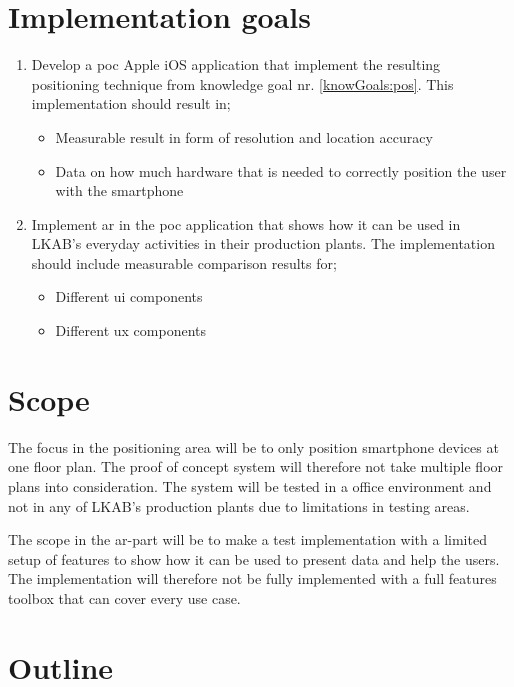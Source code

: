 \section{Implementation goals}
\begin{enumerate}
\item \label{implGoals:posPoc} Develop a \acrfull{poc} Apple iOS application that implement the resulting positioning technique from knowledge goal nr. \ref{knowGoals:pos}. This implementation should result in;
\begin{itemize}
\item Measurable result in form of resolution and location accuracy
\item Data on how much hardware that is needed to correctly position the user with the smartphone
\end{itemize}
\item Implement \acrshort{ar} in the \acrshort{poc} application that shows how it can be used in LKAB's everyday activities in their production plants.
The implementation should include measurable comparison results for;
\begin{itemize}
\item Different \acrfull{ui} components
\item Different \acrfull{ux} components
\end{itemize}
\end{enumerate}

\section{Scope}
The focus in the positioning area will be to only position smartphone devices at one floor plan.
The proof of concept system will therefore not take multiple floor plans into consideration.
The system will be tested in a office environment and not in any of LKAB's production plants due to limitations in testing areas.

\bigskip

The scope in the \acrshort{ar}-part will be to make a test implementation with a limited setup of features to show how it can be used to present data and help the users.
The implementation will therefore not be fully implemented with a full features toolbox that can cover every use case.


\section{Outline}
